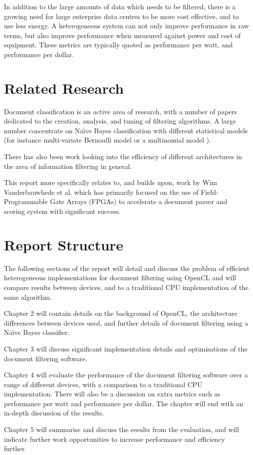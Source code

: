 In addition to the large amounts of data which needs to be filtered, there is a
growing need for large enterprise data centres to be more cost effective, and to
use less energy. A heterogeneous system can not only improve performance in raw
terms, but also improve performance when measured against power and cost of
equipment. These metrics are typically quoted as performance per watt, and
performance per dollar.

\section{Related Research}
\label{sec:relatedResearch}

Document classification is an active area of research, with a number of papers
dedicated to the creation, analysis, and tuning of filtering algorithms. A large
number concentrate on Na{\"{\i}}ve Bayes classification
\cite{androutsopoulos2000evaluation} \cite{androutsopoulos2000learning}  with
different statistical models (for instance multi-variate Bernoulli model or a
multinomial model \cite{Schneider:2003:CEM:1067807.1067848}
\cite{mccallum1998comparison}).

There has also been work looking into the efficiency of different architectures
in the area of information filtering \cite{chen2012invited}
\cite{he2013massively} in general.

This report more specifically relates to, and builds upon, work by Wim
Vanderbauwhede et al. which has primarily focused on the use of Field-
Programmable Gate Arrays (FPGAs) to accelerate a document parser and scoring
system \cite{vanderbauwhede2013high} \cite{HybridCPUFPGA}
\cite{chalamalasetti2012evaluating} with significant success.

\section{Report Structure}

The following sections of the report will detail and discuss the problem of
efficient heterogeneous implementations for document filtering using OpenCL and
will compare results between devices, and to a traditional CPU implementation of
the same algorithm.

Chapter 2 will contain details on the background of OpenCL, the architecture
differences between devices used, and further details of document filtering
using a Na{\"{\i}}ve Bayes classifier.

Chapter 3 will discuss significant implementation details and optimisations of
the document filtering software.

Chapter 4 will evaluate the performance of the document filtering software over
a range of different devices, with a comparison to a traditional CPU
implementation. There will also be a discussion on extra metrics such as
performance per watt and performance per dollar. The chapter will end with an
in-depth discussion of the results.

Chapter 5 will summarise and discuss the results from the evaluation, and will
indicate further work opportunities to increase performance and efficiency
further.
